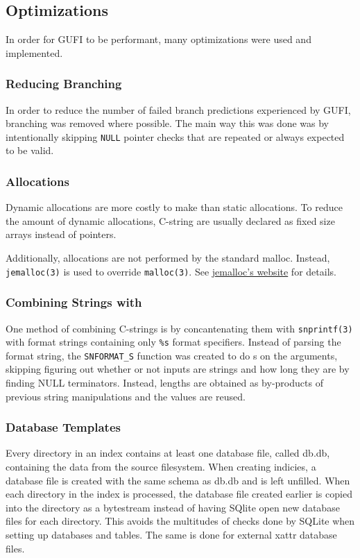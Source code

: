 \subsection{Optimizations}
In order for GUFI to be performant, many optimizations were used and
implemented.

\subsubsection{Reducing Branching}
In order to reduce the number of failed branch predictions experienced
by GUFI, branching was removed where possible. The main way this was
done was by intentionally skipping \texttt{NULL} pointer checks that
are repeated or always expected to be valid.

\subsubsection{Allocations}
Dynamic allocations are more costly to make than static
allocations. To reduce the amount of dynamic allocations, C-string are
usually declared as fixed size arrays instead of pointers.

Additionally, allocations are not performed by the standard
malloc. Instead, \texttt{jemalloc(3)} is used to override
\texttt{malloc(3)}. See \href{https://jemalloc.net/}{jemalloc's
  website} for details.

\subsubsection{Combining Strings with \memcpy}
One method of combining C-strings is by concantenating them with
\texttt{snprintf(3)} with format strings containing only \texttt{\%s}
format specifiers. Instead of parsing the format string, the
\texttt{SNFORMAT\_S} function was created to do \memcpy s on
the arguments, skipping figuring out whether or not inputs are strings
and how long they are by finding NULL terminators. Instead, lengths are
obtained as by-products of previous string manipulations and the
values are reused.

\subsubsection{Database Templates}
Every directory in an index contains at least one database file,
called db.db, containing the \lstat data from the source
filesystem. When creating indicies, a database file is created with
the same schema as db.db and is left unfilled. When each directory in
the index is processed, the database file created earlier is copied
into the directory as a bytestream instead of having SQlite open new
database files for each directory. This avoids the multitudes of
checks done by SQLite when setting up databases and tables. The same
is done for external xattr database files.

